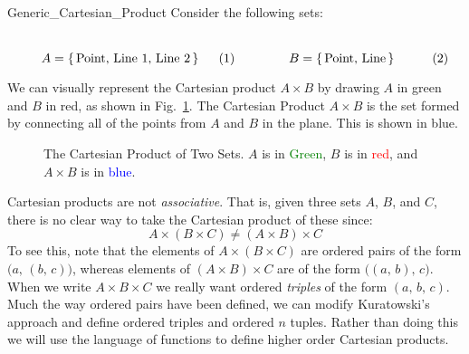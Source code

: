         \begin{lexample}{}{Generic_Cartesian_Product}
            Consider the following sets:
            \par
            \begin{subequations}
                \begin{minipage}[b]{0.49\textwidth}
                    \centering
                    \begin{equation}
                        A=\{\,\textrm{Point, Line 1, Line 2}\,\}
                    \end{equation}
                \end{minipage}
                \hfill
                \begin{minipage}[b]{0.49\textwidth}
                    \centering
                    \begin{equation}
                        B=\{\,\textrm{Point, Line}\,\}
                    \end{equation}
                \end{minipage}
            \end{subequations}
            \par\vspace{2.5ex}
            We can visually represent the Cartesian product $A\times{B}$ by
            drawing $A$ in green and $B$ in red, as shown in
            Fig.~\ref{fig:Cartesian_Product_Example}. The Cartesian Product
            $A\times{B}$ is the set formed by connecting all of the points
            from $A$ and $B$ in the plane. This is shown in blue.
        \end{lexample}
        \begin{figure}[H]
            \centering
            
            \caption[Cartesian Product of Two Sets]
                {The Cartesian Product of Two Sets. $A$ is
                 in \textcolor{green}{Green},
                 $B$ is in \textcolor{red}{red}, and
                 $A\times{B}$ is in \textcolor{blue}{blue}.}
            \label{fig:Cartesian_Product_Example}
        \end{figure}
        Cartesian products are not \textit{associative}. That is, given three
        sets $A$, $B$, and $C$, there is no clear way to take the Cartesian
        product of these since:
        \begin{equation}
            A\times(B\times{C})\ne(A\times{B})\times{C}
        \end{equation}
        To see this, note that the elements of $A\times(B\times{C})$ are
        ordered pairs of the form $\big(a,\,(b,\,c)\big)$, whereas elements of
        $(A\times{B})\times{C}$ are of the form $\big((a,\,b),\,c\big)$. When
        we write $A\times{B}\times{C}$ we really want ordered \textit{triples}
        of the form $(a,\,b,\,c)$. Much the way ordered pairs have been
        defined, we can modify Kuratowski's approach and define ordered
        triples and ordered $n$ tuples. Rather than doing this we will use the
        language of functions to define higher order Cartesian products.